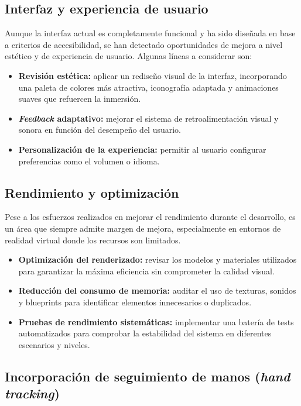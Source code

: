 \subsection*{Interfaz y experiencia de usuario}

Aunque la interfaz actual es completamente funcional y ha sido diseñada en base a criterios de accesibilidad, se han detectado oportunidades de mejora a nivel estético y de experiencia de usuario. Algunas líneas a considerar son:

\begin{itemize}
    \item \textbf{Revisión estética:} aplicar un rediseño visual de la interfaz, incorporando una paleta de colores más atractiva, iconografía adaptada y animaciones suaves que refuercen la inmersión.
    \item \textbf{\textit{Feedback} adaptativo:} mejorar el sistema de retroalimentación visual y sonora en función del desempeño del usuario.
    \item \textbf{Personalización de la experiencia:} permitir al usuario configurar preferencias como el volumen o idioma.
\end{itemize}

\subsection*{Rendimiento y optimización}

Pese a los esfuerzos realizados en mejorar el rendimiento durante el desarrollo, es un área que siempre admite margen de mejora, especialmente en entornos de realidad virtual donde los recursos son limitados.

\begin{itemize}
    \item \textbf{Optimización del renderizado:} revisar los modelos y materiales utilizados para garantizar la máxima eficiencia sin comprometer la calidad visual.
    \item \textbf{Reducción del consumo de memoria:} auditar el uso de texturas, sonidos y blueprints para identificar elementos innecesarios o duplicados.
    \item \textbf{Pruebas de rendimiento sistemáticas:} implementar una batería de tests automatizados para comprobar la estabilidad del sistema en diferentes escenarios y niveles.
\end{itemize}

\subsection*{Incorporación de seguimiento de manos (\textit{hand tracking})}

